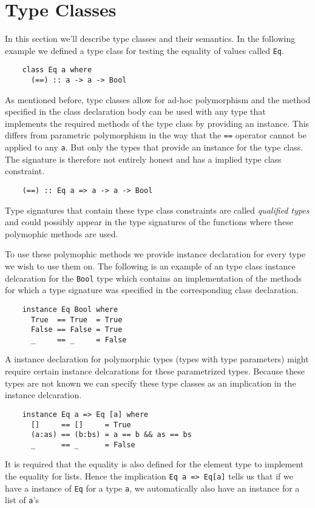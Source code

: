 \section{Type Classes}
In this section we'll describe type classes and their semantics. In the
following example we defined a type class for testing the equality of values
called \texttt{Eq}.

\begin{verbatim}
    class Eq a where
      (==) :: a -> a -> Bool
\end{verbatim}

As mentioned before, type classes allow for ad-hoc polymorphism and the method
specified in the class declaration body can be used with any type that
implements the required methods of the type class by providing an instance.
This differs from parametric polymorphism in the way that the \texttt{==}
operator cannot be applied to any \texttt{a}. But only the types that provide an
instance for the type class. The signature is therefore not entirely honest and
has a implied type class constraint.
\begin{verbatim}
    (==) :: Eq a => a -> a -> Bool
\end{verbatim}
Type signatures that contain these type class constraints are called
\textit{qualified types} and could possibly appear in the type signatures of the
functions where these polymophic methods are used.

To use these polymophic methods we provide instance declaration for every type
we wish to use them on. The following is an example of an type class instance
delcaration for the \texttt{Bool} type which contains an implementation of the
methods for which a type signature was specified in the corresponding class
declaration.
\begin{verbatim}
    instance Eq Bool where
      True  == True  = True
      False == False = True
      _     == _     = False
\end{verbatim}

A instance declaration for polymorphic types (types with type parameters) might
require certain instance delcarations for these parametrized types. Because
these types are not known we can specify these type classes as an implication in
the instance delcaration.
\begin{verbatim}
    instance Eq a => Eq [a] where
      []     == []     = True
      (a:as) == (b:bs) = a == b && as == bs
      _      == _      = False
\end{verbatim}
It is required that the equality is also defined for the element type to
implement the equality for lists. Hence the implication \texttt{Eq a => Eq[a]}
tells us that if we have a instance of \texttt{Eq} for a type \texttt{a}, we
automatically also have an instance for a list of \texttt{a}'s

